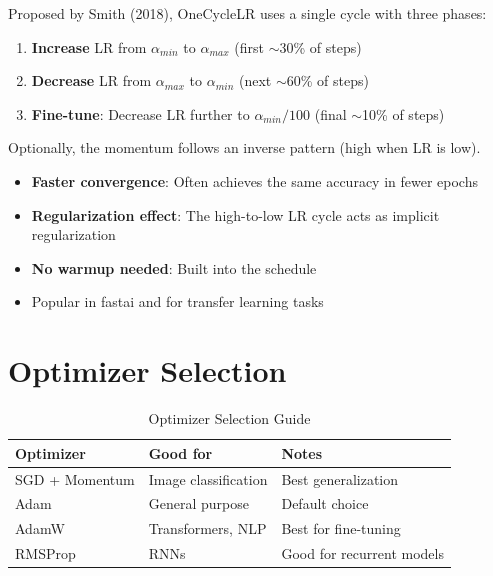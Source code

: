 Proposed by Smith (2018), OneCycleLR uses a single cycle with three phases:
\begin{enumerate}
    \item \textbf{Increase} LR from $\alpha_{min}$ to $\alpha_{max}$ (first $\sim$30\% of steps)
    \item \textbf{Decrease} LR from $\alpha_{max}$ to $\alpha_{min}$ (next $\sim$60\% of steps)
    \item \textbf{Fine-tune}: Decrease LR further to $\alpha_{min}/100$ (final $\sim$10\% of steps)
\end{enumerate}
Optionally, the momentum follows an inverse pattern (high when LR is low).

\begin{properties}
\begin{itemize}
    \item \textbf{Faster convergence}: Often achieves the same accuracy in fewer epochs
    \item \textbf{Regularization effect}: The high-to-low LR cycle acts as implicit regularization
    \item \textbf{No warmup needed}: Built into the schedule
    \item Popular in fastai and for transfer learning tasks
\end{itemize}
\end{properties}

\section{Optimizer Selection}

\begin{table}[ht]
    \centering
    \caption{Optimizer Selection Guide}
    \begin{tabular}{L{2.5cm} L{3cm} L{3.5cm}}
        \toprule
        \textbf{Optimizer} & \textbf{Good for} & \textbf{Notes} \\
        \midrule
        SGD + Momentum & Image classification & Best generalization \\
        Adam & General purpose & Default choice \\
        AdamW & Transformers, NLP & Best for fine-tuning \\
        RMSProp & RNNs & Good for recurrent models \\
        \bottomrule
    \end{tabular}
\end{table}

